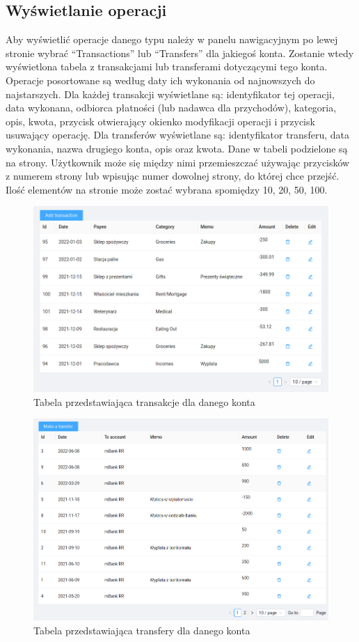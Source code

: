 \documentclass[shortabstract,inz]{iithesis}
\begin{document}
\subsection{Wyświetlanie operacji}
Aby wyświetlić operacje danego typu należy w panelu nawigacyjnym po lewej stronie wybrać ``Transactions'' lub ``Transfers'' dla jakiegoś konta. Zostanie wtedy wyświetlona tabela z transakcjami lub transferami dotyczącymi tego konta. Operacje posortowane są według daty ich wykonania od najnowszych do najstarszych. Dla każdej transakcji wyświetlane są: identyfikator tej operacji, data wykonana, odbiorca płatności (lub nadawca dla przychodów), kategoria, opis, kwota, przycisk otwierający okienko modyfikacji operacji i przycisk usuwający operację. Dla transferów wyświetlane są: identyfikator transferu, data wykonania, nazwa drugiego konta, opis oraz kwota. Dane w tabeli podzielone są na strony. Użytkownik może się między nimi przemieszczać używając przycisków z numerem strony lub wpisując numer dowolnej strony, do której chce przejść. Ilość elementów na stronie może zostać wybrana spomiędzy 10, 20, 50, 100.
\begin{figure}
	\centering
	\includegraphics[scale=0.6]{screen-transactions-list.png}
	\caption{Tabela przedstawiająca transakcje dla danego konta}
	\label{fig:screen-transactions-list}
\end{figure}
\begin{figure}
	\centering
	\includegraphics[scale=0.55]{screen-transfers-list.png}
	\caption{Tabela przedstawiająca transfery dla danego konta}
	\label{fig:screen-transfers-list}
\end{figure}
\end{document}
